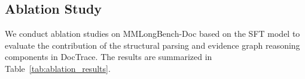 \documentclass[letterpaper]{article} %
\begin{document}



\subsection{Ablation Study}

We conduct ablation studies on MMLongBench-Doc based on the SFT model to evaluate the contribution of the structural parsing and evidence graph reasoning components in DocTrace. The results are summarized in Table~\ref{tab:ablation_results}.
\end{document}

